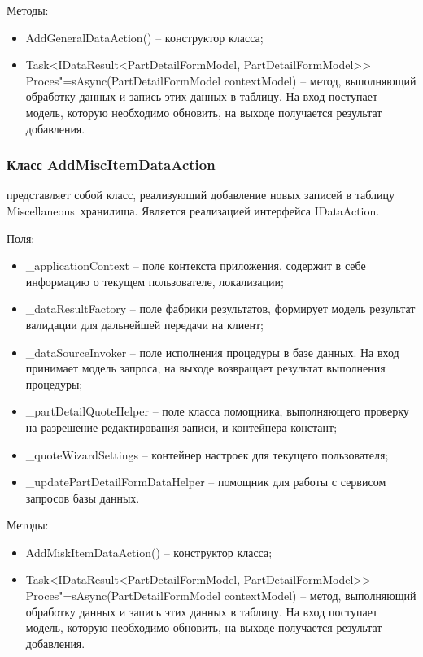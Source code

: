 Методы:
\begin{itemize}
  \item AddGeneralDataAction() – конструктор класса;
  \item Task<IDataResult<PartDetailFormModel, PartDetailFormModel>> Proces"=sAsync(PartDetailFormModel contextModel) – метод, выполняющий обработку данных и запись этих данных в таблицу. На вход поступает модель, которую необходимо обновить, на выходе получается результат добавления.
\end{itemize}

\subsubsection{Класс AddMiscItemDataAction }
\label{sub:arch_and_mod:data_layer:add_misc_item}

представляет собой класс, реализующий добавление новых записей в таблицу Miscellaneous хранилища. Является реализацией интерфейса IDataAction.

Поля:
\begin{itemize}
  \item \_applicationContext – поле контекста приложения, содержит в себе информацию о текущем пользователе, локализации;
  \item \_dataResultFactory – поле фабрики результатов, формирует модель результат валидации для дальнейшей передачи на клиент;
  \item \_dataSourceInvoker – поле исполнения процедуры в базе данных. На вход принимает модель запроса, на выходе возвращает результат выполнения процедуры;
  \item \_partDetailQuoteHelper – поле класса помощника, выполняющего проверку на разрешение редактирования записи, и контейнера констант;
  \item \_quoteWizardSettings – контейнер настроек для текущего пользователя;
  \item \_updatePartDetailFormDataHelper – помощник для работы с сервисом запросов базы данных.
\end{itemize}

Методы:
\begin{itemize}
  \item AddMiskItemDataAction() – конструктор класса;
  \item Task<IDataResult<PartDetailFormModel, PartDetailFormModel>> Proces"=sAsync(PartDetailFormModel contextModel) – метод, выполняющий обработку данных и запись этих данных в таблицу. На вход поступает модель, которую необходимо обновить, на выходе получается результат добавления.
\end{itemize}

